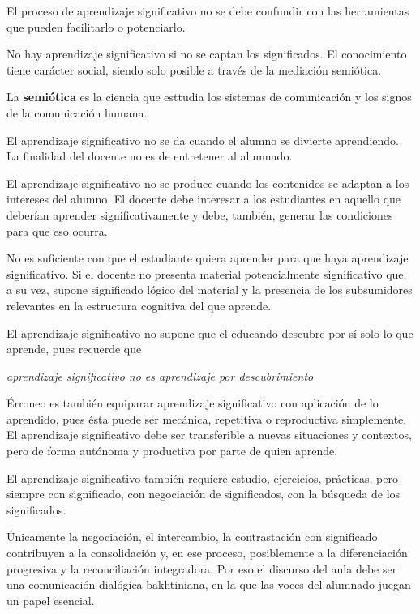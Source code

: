 \documentclass[12pt]{report}
\theoremstyle{largebreak}
\begin{document}
    El proceso de aprendizaje significativo no se debe confundir con las herramientas que pueden facilitarlo o potenciarlo.

    No hay aprendizaje significativo si no se captan los significados. El conocimiento tiene carácter social, siendo solo posible a través de la mediación semiótica.

    \begin{mydef}
        La \textbf{semiótica} es la ciencia que esttudia los sistemas de comunicación y los signos de la comunicación humana.
    \end{mydef}

    El aprendizaje significativo no se da cuando el alumno se divierte aprendiendo. La finalidad del docente no es de entretener al alumnado.

    El aprendizaje significativo no se produce cuando los contenidos se adaptan a los intereses del alumno. El docente debe interesar a los estudiantes en aquello que deberían aprender significativamente y debe, también, generar las condiciones para que eso ocurra.

    No es suficiente con que el estudiante quiera aprender para que haya aprendizaje significativo. Si el docente no presenta material potencialmente significativo que, a su vez, supone significado lógico del material y la presencia de los subsumidores relevantes en la estructura cognitiva del que aprende.

    El aprendizaje significativo no supone que el educando descubre por sí solo lo que aprende, pues recuerde que
    \begin{center}
        \textit{aprendizaje significativo no es aprendizaje por descubrimiento}
    \end{center}

    Érroneo es también equiparar aprendizaje significativo con aplicación de lo aprendido, pues ésta puede ser mecánica, repetitiva o reproductiva simplemente. El aprendizaje significativo debe ser transferible a nuevas situaciones y contextos, pero de forma autónoma y productiva por parte de quien aprende.

    El aprendizaje significativo también requiere estudio, ejercicios, prácticas, pero siempre con significado, con negociación de significados, con la búsqueda de los significados.

    Únicamente la negociación, el intercambio, la
    contrastación con significado contribuyen a la consolidación y, en ese proceso, posiblemente a la diferenciación progresiva y la reconciliación integradora. Por eso el discurso del aula debe ser una comunicación dialógica bakhtiniana, en la que las voces del alumnado juegan un papel esencial.
\end{document}
